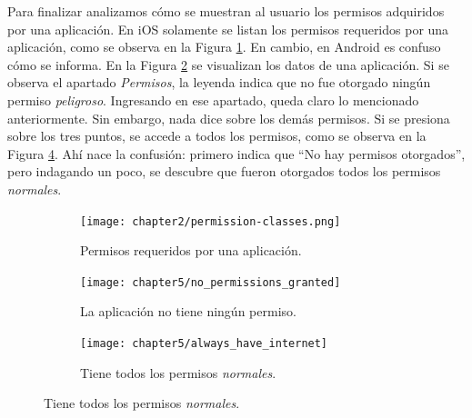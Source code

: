 Para finalizar analizamos cómo se muestran al usuario los permisos adquiridos por una aplicación. En iOS solamente se listan los permisos requeridos por una aplicación, como se observa en la Figura \ref{fig:ch05:ios_all_permissions}. En cambio, en Android es confuso cómo se informa. En la Figura \ref{fig:ch05:without_permissions} se visualizan los datos de una aplicación. Si se observa el apartado \emph{Permisos}, la leyenda indica que no fue otorgado ningún permiso \emph{peligroso}. Ingresando en ese apartado, queda claro lo mencionado anteriormente. Sin embargo, nada dice sobre los demás permisos. Si se presiona sobre los tres puntos, se accede a todos los permisos, como se observa en la Figura \ref{fig:ch05:always_have_internet}. Ahí nace la confusión: primero indica que ``No hay permisos otorgados'', pero indagando un poco, se descubre que fueron otorgados todos los permisos \emph{normales}.
\begin{figure}[hbtp]
	\centering
	\begin{subfigure}{.3\linewidth}
		\texttt{[image: chapter2/permission-classes.png]}
		\caption{Permisos requeridos por una aplicación.}
		\label{fig:ch05:ios_all_permissions}
	\end{subfigure}
	\begin{subfigure}{.3\linewidth}
		\texttt{[image: chapter5/no\_permissions\_granted]}
		\caption{La aplicación no tiene ningún permiso.}
		\label{fig:ch05:without_permissions}
	\end{subfigure}
	\begin{subfigure}{.3\linewidth}
		\texttt{[image: chapter5/always\_have\_internet]}
		\caption{Tiene todos los permisos \emph{normales}.}
		\label{fig:ch05:always_have_internet}
	\end{subfigure}
\end{figure}